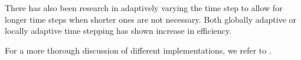 \documentclass[../../main.tex]{subfiles}
\begin{document}
There has also been research in adaptively varying the time step to allow for longer time steps when shorter ones are not necessary. Both globally adaptive \citep{ihmsen2010boundary,goswami2011time} or locally adaptive \citep{goswami2014regional} time stepping has shown increase in efficiency. 


For a more thorough discussion of different implementations, we refer to \citet{ihmsen2014sph}.
\end{document}
